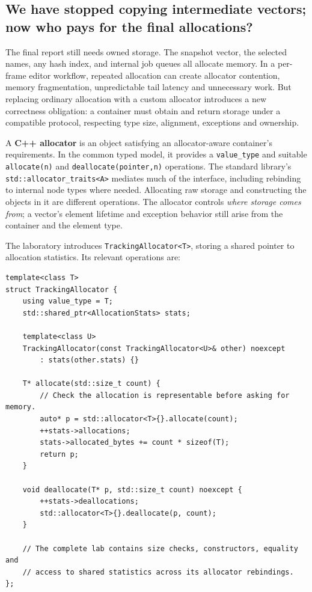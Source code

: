 \subsection{We have stopped copying intermediate vectors; now who pays for the final allocations?}\label{05-engine-i-ch006-we-have-stopped-copying-intermediate-vectors-now-who-pays-for-the-final-allocations}

The final report still needs owned storage. The snapshot vector, the selected names, any hash index, and internal job queues all allocate memory. In a per-frame editor workflow, repeated allocation can create allocator contention, memory fragmentation, unpredictable tail latency and unnecessary work. But replacing ordinary allocation with a custom allocator introduces a new correctness obligation: a container must obtain and return storage under a compatible protocol, respecting type size, alignment, exceptions and ownership.

A \textbf{C++ allocator} is an object satisfying an allocator-aware container's requirements. In the common typed model, it provides a \texttt{value\_type} and suitable \texttt{allocate(n)} and \texttt{deallocate(pointer,n)} operations. The standard library's \texttt{std::allocator\_traits\textless{}A\textgreater{}} mediates much of the interface, including rebinding to internal node types where needed. Allocating raw storage and constructing the objects in it are different operations. The allocator controls \emph{where storage comes from}; a vector's element lifetime and exception behavior still arise from the container and the element type.

The laboratory introduces \texttt{TrackingAllocator\textless{}T\textgreater{}}, storing a shared pointer to allocation statistics. Its relevant operations are:

\begin{verbatim}
template<class T>
struct TrackingAllocator {
    using value_type = T;
    std::shared_ptr<AllocationStats> stats;

    template<class U>
    TrackingAllocator(const TrackingAllocator<U>& other) noexcept
        : stats(other.stats) {}

    T* allocate(std::size_t count) {
        // Check the allocation is representable before asking for memory.
        auto* p = std::allocator<T>{}.allocate(count);
        ++stats->allocations;
        stats->allocated_bytes += count * sizeof(T);
        return p;
    }

    void deallocate(T* p, std::size_t count) noexcept {
        ++stats->deallocations;
        std::allocator<T>{}.deallocate(p, count);
    }

    // The complete lab contains size checks, constructors, equality and
    // access to shared statistics across its allocator rebindings.
};
\end{verbatim}

